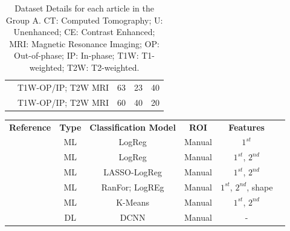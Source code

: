 \documentclass{article}
\begin{document}
\begin{table}[]
\begin{tabular}{ccccc}
        \cite{Tu2020}                       & T1W-OP/IP; T2W MRI                       & 63                                                 & 23                & 40             \\
        \cite{Romeo2018}                    & T1W-OP/IP; T2W MRI                       & 60                                                 & 40                & 20
        \\\bottomrule
    \end{tabular}
    \caption{Dataset Details for each article in the Group A. CT: Computed Tomography; U: Unenhanced; CE: Contrast Enhanced; MRI: Magnetic Resonance Imaging; OP: Out-of-phase; IP: In-phase; T1W: T1-weighted; T2W: T2-weighted.}
    \label{tab:data_A}
\end{table}

\begin{table}[]
    \centering
    \begin{tabular}{cccccc}\toprule
        \multirow{2}{*}{\textbf{Reference}} & \multirow{2}{*}{\textbf{Type}} & \multirow{2}{*}{\textbf{Classification Model}} & \multirow{2}{*}{\textbf{ROI}} & \multirow{2}{*}{\textbf{Features}} \\
        \\\midrule
        \cite{Tu2018}                       & ML                             & LogReg                                         & Manual                        & $1^{st}$                           \\
        \cite{Yi20181}                      & ML                             & LogReg                                         & Manual                        & $1^{st}$, $2^{nd}$                 \\
        \cite{Yi2018}                       & ML                             & LASSO-LogReg                                   & Manual                        & $1^{st}$, $2^{nd}$                 \\
        \cite{Elmohr2019}                   & ML                             & RanFor; LogREg                                 & Manual                        & $1^{st}$, $2^{nd}$, shape          \\
        \cite{Torresan2021}                 & ML                             & K-Means                                        & Manual                        & $1^{st}$, $2^{nd}$                 \\
        \cite{Kusunoki2022}                 & DL                             & DCNN                                           & Manual                        & -                                  \\

\end{tabular}
\end{table}
\end{document}
